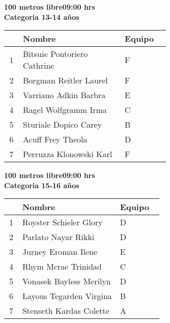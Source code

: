 \begin{minipage}{0.95\linewidth}\vspace{0.5cm} 
\begin{flushleft}
\textbf{
\hspace{-0.15cm}100 metros libre\hspace{1.5cm}09:00 hrs \\Categoria 13-14 años}\vspace{-0.2cm} 
\end{flushleft}
\begin{tabular}{cp{0.63\linewidth}l}
\hline
& \textbf{Nombre} & \textbf{Equipo} \\ \hline
1 & Bitsuie Pontoriero Cathrine & F \\ 
2 & Borgman Reitler Laurel & F \\ 
3 & Varriano Adkin Barbra & E \\ 
4 & Ragel Wolfgramm Irma & C \\ 
5 & Sturiale Dopico Carey & B \\ 
6 & Acuff Frey Theola & D \\ 
7 & Perruzza Klonowski Karl & F \\ 
\end{tabular}
\end{minipage}
\begin{minipage}{0.95\linewidth}\vspace{0.5cm} 
\begin{flushleft}
\textbf{
\hspace{-0.15cm}100 metros libre\hspace{1.5cm}09:00 hrs \\Categoria 15-16 años}\vspace{-0.2cm} 
\end{flushleft}
\begin{tabular}{cp{0.63\linewidth}l}
\hline
& \textbf{Nombre} & \textbf{Equipo} \\ \hline
1 & Royster Schieler Glory & D \\ 
2 & Parlato Nayar Rikki & D \\ 
3 & Jurney Eroman Ilene & E \\ 
4 & Rhym Mcrae Trinidad & C \\ 
5 & Vonasek Bayless Merilyn & D \\ 
6 & Layous Tegarden Virgina & B \\ 
7 & Stenseth Kardas Colette & A \\ 
\end{tabular}
\end{minipage}
